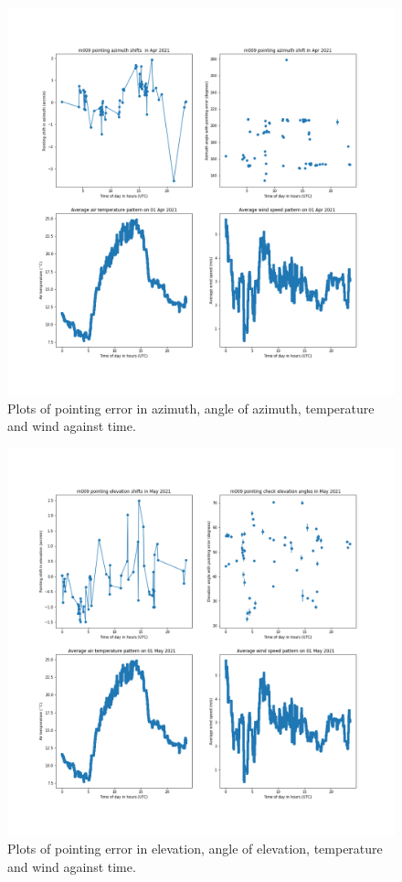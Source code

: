 \documentclass{article}
\begin{document}
\begin{figure}[H]
	\centering
	\includegraphics[scale=0.45]{m009_azim_Apr.png}
	
	\caption{Plots of pointing error in azimuth, angle of azimuth, temperature and wind against time.}
	\label{fig:m009AzimApr}
\end{figure}

\begin{figure}[H]
	\centering
	\includegraphics[scale=0.45]{m009_elev_May.png}
	
	\caption{Plots of pointing error in elevation, angle of elevation, temperature and wind against time.}
	\label{fig:m009ElevMay}
\end{figure}
\end{document}
